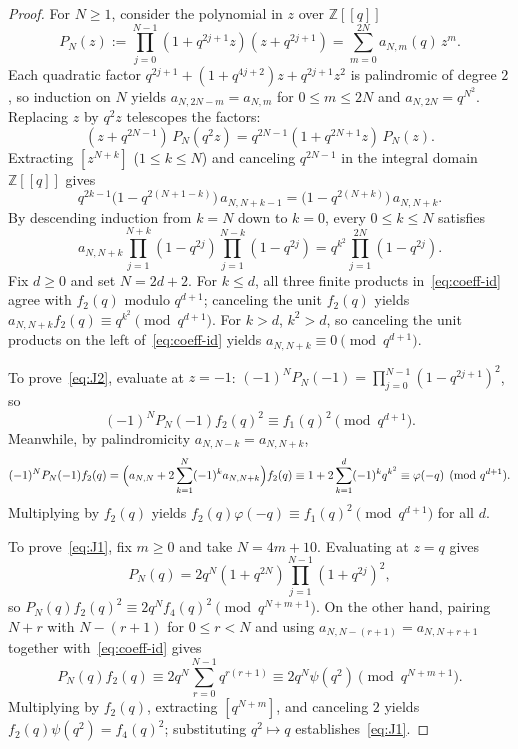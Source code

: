 \documentclass[11pt]{article}
\begin{document}
\begin{proof}
For $N \ge 1$, consider the polynomial in $z$ over $\mathbb{Z}[[q]]$
\[
P_N(z) := \prod_{j=0}^{N-1} (1 + q^{2j+1}z)(z + q^{2j+1}) = \sum_{m=0}^{2N} a_{N,m}(q)\, z^m.
\]
Each quadratic factor $q^{2j+1} + (1 + q^{4j+2})z + q^{2j+1}z^2$ is palindromic of degree $2$, so induction on $N$ yields $a_{N, 2N-m} = a_{N, m}$ for $0 \le m \le 2N$ and $a_{N, 2N} = q^{N^2}$. Replacing $z$ by $q^2 z$ telescopes the factors:
\[
(z + q^{2N-1})\, P_N(q^2 z) = q^{2N-1}(1 + q^{2N+1}z)\, P_N(z).
\]
Extracting $[z^{N+k}]$ ($1 \le k \le N$) and canceling $q^{2N-1}$ in the integral domain $\mathbb{Z}[[q]]$ gives
\[
q^{2k-1}\bigl(1 - q^{2(N+1-k)}\bigr)\, a_{N, N+k-1} = \bigl(1 - q^{2(N+k)}\bigr)\, a_{N, N+k}.
\]
By descending induction from $k = N$ down to $k = 0$, every $0 \le k \le N$ satisfies
\begin{equation}\label{eq:coeff-id}
a_{N, N+k} \prod_{j=1}^{N+k}(1 - q^{2j}) \prod_{j=1}^{N-k}(1 - q^{2j}) = q^{k^2} \prod_{j=1}^{2N}(1 - q^{2j}).
\end{equation}
Fix $d \ge 0$ and set $N = 2d+2$. For $k \le d$, all three finite products in~\eqref{eq:coeff-id} agree with $f_2(q)$ modulo $q^{d+1}$; canceling the unit $f_2(q)$ yields $a_{N, N+k} f_2(q) \equiv q^{k^2} \pmod{q^{d+1}}$. For $k > d$, $k^2 > d$, so canceling the unit products on the left of~\eqref{eq:coeff-id} yields $a_{N, N+k} \equiv 0 \pmod{q^{d+1}}$.

To prove~\eqref{eq:J2}, evaluate at $z = -1$: $(-1)^N P_N(-1) = \prod_{j=0}^{N-1}(1 - q^{2j+1})^2$, so
\[
(-1)^N P_N(-1) f_2(q)^2 \equiv f_1(q)^2 \pmod{q^{d+1}}.
\]
Meanwhile, by palindromicity $a_{N, N-k} = a_{N, N+k}$,
\[
(-1)^N P_N(-1) f_2(q) = \Bigl(a_{N, N} + 2\sum_{k=1}^N (-1)^k a_{N, N+k}\Bigr) f_2(q) \equiv 1 + 2\sum_{k=1}^d (-1)^k q^{k^2} \equiv \varphi(-q) \pmod{q^{d+1}}.
\]
Multiplying by $f_2(q)$ yields $f_2(q)\varphi(-q) \equiv f_1(q)^2 \pmod{q^{d+1}}$ for all $d$.

To prove~\eqref{eq:J1}, fix $m \ge 0$ and take $N = 4m+10$. Evaluating at $z = q$ gives
\[
P_N(q) = 2q^N(1 + q^{2N})\prod_{j=1}^{N-1}(1 + q^{2j})^2,
\]
so $P_N(q)f_2(q)^2 \equiv 2q^N f_4(q)^2 \pmod{q^{N+m+1}}$. On the other hand, pairing $N+r$ with $N-(r+1)$ for $0 \le r < N$ and using $a_{N, N-(r+1)} = a_{N, N+r+1}$ together with~\eqref{eq:coeff-id} gives
\[
P_N(q)f_2(q) \equiv 2q^N \sum_{r=0}^{N-1} q^{r(r+1)} \equiv 2q^N \psi(q^2) \pmod{q^{N+m+1}}.
\]
Multiplying by $f_2(q)$, extracting $[q^{N+m}]$, and canceling $2$ yields $f_2(q)\psi(q^2) = f_4(q)^2$; substituting $q^2 \mapsto q$ establishes~\eqref{eq:J1}.
\end{proof}
\end{document}
